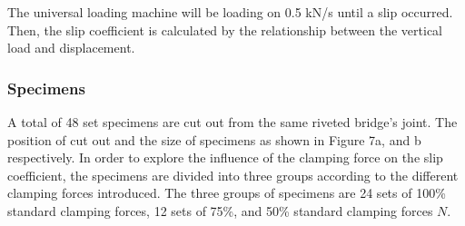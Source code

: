 The universal loading machine will be loading on 0.5 kN/s until a slip occurred. Then, the slip coefficient is calculated by the relationship between the vertical load and displacement.

\subsubsection{Specimens}

A total of 48 set specimens are cut out from the same riveted bridge's joint. The position of cut out and the size of specimens as shown in Figure 7a, and b respectively. In order to explore the influence of the clamping force on the slip coefficient, the specimens are divided into three groups according to the different clamping forces introduced. The three groups of specimens are 24 sets of 100\% standard clamping forces, 12 sets of 75\%, and 50\% standard clamping forces $N$. 

